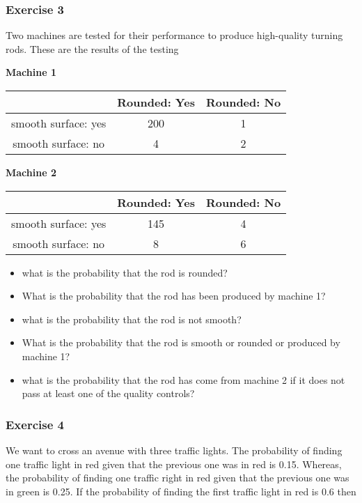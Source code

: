 \documentclass[
]{book}
\providecommand{\tightlist}{%
  \setlength{\itemsep}{0pt}\setlength{\parskip}{0pt}}
\begin{document}
\hypertarget{exercise-3}{%
\subsubsection{Exercise 3}\label{exercise-3}}

Two machines are tested for their performance to produce high-quality turning rods. These are the results of the testing

\textbf{Machine 1}

\begin{longtable}[]{@{}ccc@{}}
\toprule
& Rounded: Yes & Rounded: No \\
\midrule
\endhead
smooth surface: yes & 200 & 1 \\
smooth surface: no & 4 & 2 \\
\bottomrule
\end{longtable}

\textbf{Machine 2}

\begin{longtable}[]{@{}ccc@{}}
\toprule
& Rounded: Yes & Rounded: No \\
\midrule
\endhead
smooth surface: yes & 145 & 4 \\
smooth surface: no & 8 & 6 \\
\bottomrule
\end{longtable}

\begin{itemize}
\tightlist
\item
  what is the probability that the rod is rounded?
\item
  What is the probability that the rod has been produced by machine 1?
\item
  what is the probability that the rod is not smooth?
\item
  What is the probability that the rod is smooth or rounded or produced by machine 1?
\item
  what is the probability that the rod has come from machine 2 if it does not pass at least one of the quality controls?
\end{itemize}

\hypertarget{exercise-4}{%
\subsubsection{Exercise 4}\label{exercise-4}}

We want to cross an avenue with three traffic lights. The probability of finding one traffic light in red given that the previous one was in red is 0.15. Whereas, the probability of finding one traffic right in red given that the previous one was in green is 0.25. If the probability of finding the first traffic light in red is 0.6 then
\end{document}
